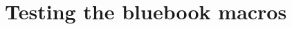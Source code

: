 \documentclass[12pt,\documentclassflag]{lawbrief}
\begin{document}
\section{Testing the bluebook macros}








  

  
\end{document}
